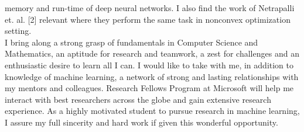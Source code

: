 memory and run-time of deep neural networks. I also find the work of Netrapalli et. al. [2] relevant where
they perform the same task in nonconvex optimization setting.
\\
I bring along a strong grasp of fundamentals in Computer Science and Mathematics, an aptitude for research and teamwork, a zest for challenges and an enthusiastic desire to learn all I can. I would like to take
with me, in addition to knowledge of machine learning, a network of strong and lasting relationships with my
mentors and colleagues. Research Fellows Program at Microsoft will help me interact with best researchers
across the globe and gain extensive research experience. As a highly motivated student to pursue research
in machine learning, I assure my full sincerity and hard work if given this wonderful opportunity.